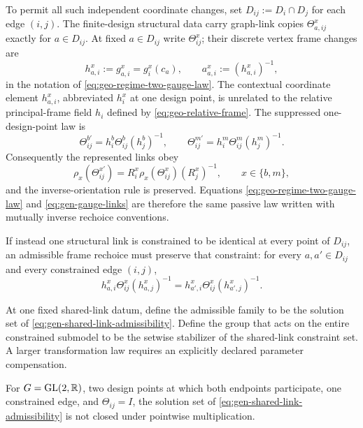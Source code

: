 To permit all such independent coordinate changes, set
\(D_{ij}:=D_i\cap D_j\) for each edge \((i,j)\). The finite-design structural
data carry graph-link copies \(\Theta_{a,ij}^x\) exactly for \(a\in D_{ij}\).
At fixed \(a\in D_{ij}\) write \(\Theta_{ij}^x\); their discrete vertex frame
changes are
\begin{equation}
h_{a,i}^x:=g_{a,i}^x=g_i^x(c_a),
\qquad
a_{a,i}^x:=(h_{a,i}^x)^{-1},
\label{eq:gen-contextual-frame-change}
\end{equation}
in the notation of \eqref{eq:geo-regime-two-gauge-law}.  The contextual coordinate element
$h_{a,i}^x$, abbreviated $h_i^x$ at one design point, is unrelated to the relative
principal-frame field $h_i$ defined by \eqref{eq:geo-relative-frame}.  The suppressed
one-design-point law is
\begin{equation}
\Theta_{ij}^{b\prime}=h_i^b\Theta_{ij}^b(h_j^b)^{-1},
\qquad
\Theta_{ij}^{m\prime}=h_i^m\Theta_{ij}^m(h_j^m)^{-1}.
\label{eq:gen-gauge-links}
\end{equation}
Consequently the represented links obey
\begin{equation}
\rho_x(\Theta_{ij}^{x\prime})
=R_i^x\rho_x(\Theta_{ij}^x)(R_j^x)^{-1},
\qquad x\in\{b,m\},
\label{eq:gen-represented-gauge-links}
\end{equation}
and the inverse-orientation rule is preserved.  Equations
\eqref{eq:geo-regime-two-gauge-law} and \eqref{eq:gen-gauge-links} are therefore the same passive
law written with mutually inverse rechoice conventions. 

If instead one structural link is constrained to be identical at every point of
\(D_{ij}\), an admissible frame rechoice must preserve that constraint:
for every \(a,a'\in D_{ij}\) and every constrained edge \((i,j)\),
\begin{equation}
h_{a,i}^x\Theta_{ij}^x(h_{a,j}^x)^{-1}
=h_{a',i}^x\Theta_{ij}^x(h_{a',j}^x)^{-1}.
\label{eq:gen-shared-link-admissibility}
\end{equation}

At one fixed shared-link datum, define the admissible family to be the solution set of
\eqref{eq:gen-shared-link-admissibility}.  Define the group that acts on the entire constrained
submodel to be the setwise stabilizer of the shared-link constraint set.  A larger
transformation law requires an explicitly declared parameter compensation.

For $G=\mathrm{GL}(2,\mathbb R)$, two design points at which both endpoints participate, one constrained edge,
and $\Theta_{ij}=I$, the solution set of \eqref{eq:gen-shared-link-admissibility} is not closed under
pointwise multiplication. 


